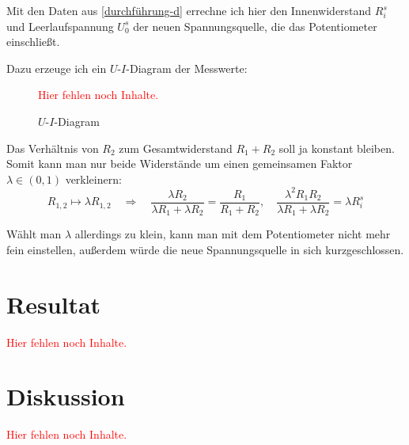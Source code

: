 \documentclass[11pt]{article}
\newcommand{\fehlt}{\textcolor{red}{Hier fehlen noch Inhalte.}}
\begin{document}
Mit den Daten aus \ref{durchführung-d} errechne ich hier den Innenwiderstand
$R_i^s$ und Leerlaufspannung $U_0^s$ der neuen Spannungsquelle, die das
Potentiometer einschließt.

Dazu erzeuge ich ein $U$-$I$-Diagram der Messwerte:

\begin{figure}[h!]
	\centering
	\fehlt
	\caption{$U$-$I$-Diagram}
\end{figure}

Das Verhältnis von $R_2$ zum Gesamtwiderstand $R_1 + R_2$ soll ja konstant
bleiben. Somit kann man nur beide Widerstände um einen gemeinsamen Faktor
$\lambda \in (0, 1)$ verkleinern:
\[
	R_{1,2} \mapsto \lambda R_{1,2}
	\quad \Rightarrow \quad
	\frac{\lambda R_2}{\lambda R_1 + \lambda R_2} = \frac{R_1}{R_1 + R_2},
	\quad
	\frac{\lambda^2 R_1 R_2}{\lambda R_1 + \lambda R_2} = \lambda R_i^s
\]

Wählt man $\lambda$ allerdings zu klein, kann man mit dem Potentiometer nicht
mehr fein einstellen, außerdem würde die neue Spannungsquelle in sich
kurzgeschlossen.


\section{Resultat}

\fehlt


\section{Diskussion}

\fehlt
\end{document}
